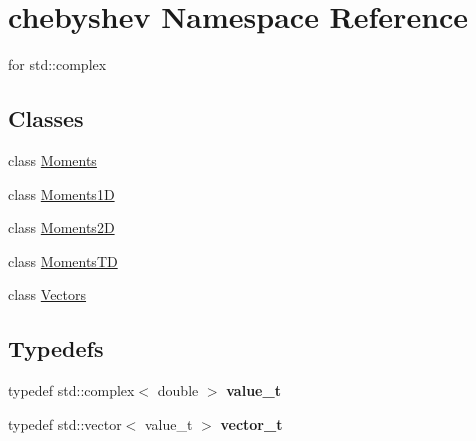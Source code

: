 \hypertarget{namespacechebyshev}{}\section{chebyshev Namespace Reference}
\label{namespacechebyshev}


for std\+::complex  


\subsection*{Classes}
\begin{DoxyCompactItemize}
\item 
class \hyperlink{classchebyshev_1_1_moments}{Moments}
\item 
class \hyperlink{classchebyshev_1_1_moments1_d}{Moments1D}
\item 
class \hyperlink{classchebyshev_1_1_moments2_d}{Moments2D}
\item 
class \hyperlink{classchebyshev_1_1_moments_t_d}{Moments\+TD}
\item 
class \hyperlink{classchebyshev_1_1_vectors}{Vectors}
\end{DoxyCompactItemize}
\subsection*{Typedefs}
\begin{DoxyCompactItemize}
\item 
typedef std\+::complex$<$ double $>$ {\bfseries value\+\_\+t}\hypertarget{namespacechebyshev_a7b581f85d91d76f261492b6a2c339a5d}{}\label{namespacechebyshev_a7b581f85d91d76f261492b6a2c339a5d}

\item 
typedef std\+::vector$<$ value\+\_\+t $>$ {\bfseries vector\+\_\+t}\hypertarget{namespacechebyshev_a19e5c68f1dd9883eaf75278e54d371a0}{}\label{namespacechebyshev_a19e5c68f1dd9883eaf75278e54d371a0}

\end{DoxyCompactItemize}
